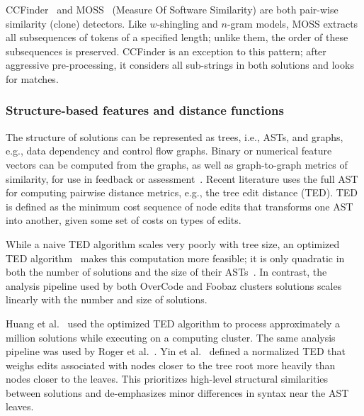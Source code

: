 CCFinder~\cite{CCFinder} and MOSS~\cite{schleimer2003winnowing} (Measure Of Software Similarity) are both pair-wise similarity (clone) detectors. Like $w$-shingling and $n$-gram models, MOSS extracts all subsequences of tokens of a specified length; unlike them, the order of these subsequences is preserved. CCFinder \cite{CCFinder} is an exception to this pattern; after aggressive pre-processing, it considers all sub-strings in both solutions and looks for matches.

\subsubsection{Structure-based features and distance functions}

The structure of solutions can be represented as trees, i.e., ASTs, and graphs, e.g., data dependency and control flow graphs. Binary or numerical feature vectors can be computed from the graphs, as well as graph-to-graph metrics of similarity, for use in feedback or assessment~\cite{Robinson:1980,srikant2014system}. Recent literature uses the full AST for computing pairwise distance metrics, e.g., the tree edit distance (TED). TED is defined as the minimum cost sequence of node edits that transforms one AST into another, given some set of costs on types of edits. 


While a naive TED algorithm scales very poorly with tree size, an optimized TED algorithm~\cite{shasha1994exact} makes this computation more feasible; it is only quadratic in both the number of solutions and the size of their ASTs~\cite{MOOCshop}. In contrast, the analysis pipeline used by both OverCode and Foobaz clusters solutions scales linearly with the number and size of solutions. 

Huang et al.~\cite{MOOCshop} used the optimized TED algorithm to process approximately a million solutions while executing on a computing cluster. The same analysis pipeline was used by Roger et al.~\cite{ACESthesis}. Yin et al.~\cite{yin2015clustering} defined a normalized TED that weighs edits associated with nodes closer to the tree root more heavily than nodes closer to the leaves. This prioritizes high-level structural similarities between solutions and de-emphasizes minor differences in syntax near the AST leaves.

